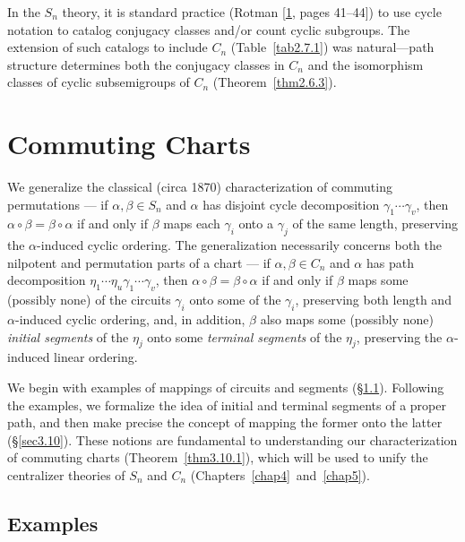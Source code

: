 \documentclass{surv-l}
\numberwithin{equation}{section}
\numberwithin{table}{section}
\numberwithin{figure}{section}
\theoremstyle{definition}
\begin{document}
In the $S_{n}$ theory, it is standard practice
(Rotman [\hyperlink{bib65}{1}, pages
41--44]) to use cycle notation to catalog conjugacy classes
and/or count cyclic subgroups. The extension of such catalogs to
include $C_{n}$ (Table~\ref{tab2.7.1}) was natural---path
structure determines both the conjugacy classes in $C_{n}$ and the
isomorphism classes of cyclic subsemigroups of $C_{n}$
(Theorem~\ref{thm2.6.3}).

\chapter{Commuting Charts}\label{chap3}

We generalize the classical (circa 1870) characterization of
commuting permutations --- if $\alpha,\beta\in S_{n}$ and $\alpha$
has disjoint cycle decomposition $\gamma_{1}\cdots\gamma_{v}$,
then $\alpha\circ\beta=\beta \circ\alpha$ if and only if $\beta$
maps each $\gamma_{i}$ onto a $\gamma_{j}$ of the same length,
preserving the $\alpha$-induced cyclic ordering. The
generalization necessarily concerns both the nilpotent and
permutation parts of a chart --- if $\alpha,\beta\in C_{n}$ and
$\alpha$ has path decomposition
$\eta_{1}\cdots\eta_{u}\gamma_{1}\cdots\gamma_{v}$, then $\alpha
\circ\beta=\beta \circ\alpha$ if and only if $\beta$ maps some
(possibly none) of the circuits $\gamma_{i}$ onto some of the
$\gamma_{i}$, preserving both length and $\alpha$-induced cyclic
ordering, and, in addition, $\beta$ also maps some (possibly none)
\emph{initial segments} of the
$\eta_{j}$ onto some \emph{terminal segments} of the $\eta_{j}$, preserving the $\alpha$-induced
linear ordering.

We begin with examples of mappings of circuits and segments
(\S\ref{sec3.9}). Following the examples, we formalize the idea of
initial and terminal segments of a proper path, and then make
precise the concept of mapping the former onto the latter
(\S\ref{sec3.10}). These notions are fundamental to understanding
our characterization of commuting charts
(Theorem~\ref{thm3.10.1}), which will be used to unify the
centralizer theories of $S_{n}$ and $C_{n}$
(Chapters~\ref{chap4}~and~\ref{chap5}).

\setcounter{section}{8}
\section{Examples}\label{sec3.9}
\end{document}
